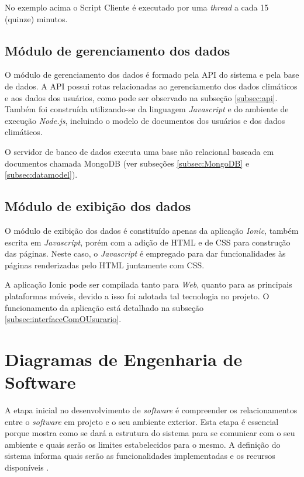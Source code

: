 
No exemplo acima o Script Cliente é executado por uma \textit{thread} a cada 15 (quinze) minutos.

\subsection{Módulo de gerenciamento dos dados}

O módulo de gerenciamento dos dados é formado pela API do sistema e pela base de dados. A API possui rotas relacionadas ao gerenciamento dos dados climáticos e aos dados dos usuários, como pode ser observado na subseção \ref{subsec:api}. Também foi construída utilizando-se da linguagem \textit{Javascript} e do ambiente de execução \textit{Node.js}, incluindo o modelo de documentos dos usuários e dos dados climáticos.
 
O servidor de banco de dados executa uma base não relacional baseada em documentos chamada MongoDB (ver subseções \ref{subsec:MongoDB} e \ref{subsec:datamodel}).

 \subsection{Módulo de exibição dos dados}

O módulo de exibição dos dados é constituído apenas da aplicação \textit{Ionic}, também escrita em \textit{Javascript}, porém com a adição de HTML e de CSS para construção das páginas. Neste caso, o \textit{Javascript} é empregado para dar funcionalidades às páginas renderizadas pelo HTML juntamente com CSS.

A aplicação Ionic pode ser compilada tanto para \textit{Web}, quanto para as principais plataformas móveis, devido a isso foi adotada tal tecnologia no projeto. O funcionamento da aplicação está detalhado na subseção \ref{subsec:interfaceComOUsurario}.


\section{Diagramas de Engenharia de Software} \label{sec:diagramas}
A etapa inicial no desenvolvimento de \textit{software} é compreender os relacionamentos entre o \textit{software} em projeto e o seu ambiente exterior. Esta etapa é essencial porque mostra como se dará a estrutura do sistema para se comunicar com o seu ambiente e quais serão os limites estabelecidos para o mesmo. A definição do sistema informa quais serão as funcionalidades implementadas e os recursos disponíveis \cite{sommerville2011engenharia}.

